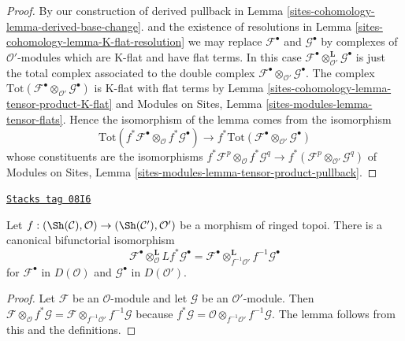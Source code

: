 \begin{proof}
By our construction of derived pullback in
Lemma \ref{sites-cohomology-lemma-derived-base-change}.
and the existence of resolutions in
Lemma \ref{sites-cohomology-lemma-K-flat-resolution}
we may replace $\mathcal{F}^\bullet$ and $\mathcal{G}^\bullet$
by complexes of $\mathcal{O}'$-modules which are K-flat and have
flat terms. In this case
$\mathcal{F}^\bullet \otimes_{\mathcal{O}'}^{\mathbf{L}} \mathcal{G}^\bullet$
is just the total complex associated to the double complex
$\mathcal{F}^\bullet \otimes_{\mathcal{O}'} \mathcal{G}^\bullet$.
The complex
$\text{Tot}(\mathcal{F}^\bullet \otimes_{\mathcal{O}'} \mathcal{G}^\bullet)$
is K-flat with flat terms by Lemma \ref{sites-cohomology-lemma-tensor-product-K-flat} and
Modules on Sites, Lemma \ref{sites-modules-lemma-tensor-flats}.
Hence the isomorphism of the lemma comes from the isomorphism
$$
\text{Tot}(f^*\mathcal{F}^\bullet \otimes_{\mathcal{O}}
f^*\mathcal{G}^\bullet)
\longrightarrow
f^*\text{Tot}(\mathcal{F}^\bullet \otimes_{\mathcal{O}'} \mathcal{G}^\bullet)
$$
whose constituents are the isomorphisms
$f^*\mathcal{F}^p \otimes_{\mathcal{O}} f^*\mathcal{G}^q \to
f^*(\mathcal{F}^p \otimes_{\mathcal{O}'} \mathcal{G}^q)$ of
Modules on Sites, Lemma \ref{sites-modules-lemma-tensor-product-pullback}.
\end{proof}

\begin{lemma}
\label{sites-cohomology-lemma-variant-derived-pullback}
\href{https://stacks.math.columbia.edu/tag/08I6}{\texttt{Stacks tag 08I6}}

Let $f : (\Sh(\mathcal{C}), \mathcal{O}) \to (\Sh(\mathcal{C}'), \mathcal{O}')$
be a morphism of ringed topoi. There is a canonical bifunctorial
isomorphism
$$
\mathcal{F}^\bullet
\otimes_\mathcal{O}^{\mathbf{L}}
Lf^*\mathcal{G}^\bullet
=
\mathcal{F}^\bullet
\otimes_{f^{-1}\mathcal{O}'}^{\mathbf{L}}
f^{-1}\mathcal{G}^\bullet
$$
for $\mathcal{F}^\bullet$ in $D(\mathcal{O})$ and
$\mathcal{G}^\bullet$ in $D(\mathcal{O}')$.
\end{lemma}

\begin{proof}
Let $\mathcal{F}$ be an $\mathcal{O}$-module and let $\mathcal{G}$
be an $\mathcal{O}'$-module. Then
$\mathcal{F} \otimes_{\mathcal{O}} f^*\mathcal{G} =
\mathcal{F} \otimes_{f^{-1}\mathcal{O}'} f^{-1}\mathcal{G}$
because
$f^*\mathcal{G} =
\mathcal{O} \otimes_{f^{-1}\mathcal{O}'} f^{-1}\mathcal{G}$.
The lemma follows from this and the definitions.
\end{proof}


